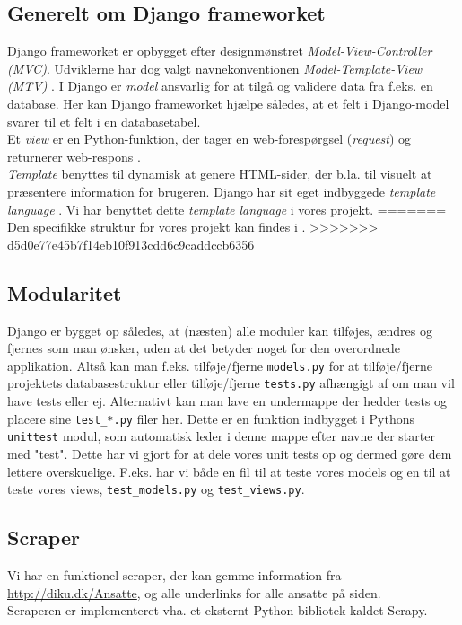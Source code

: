 \documentclass[12pt]{article}
\begin{document}
\subsection{Generelt om Django frameworket}
Django frameworket er opbygget efter designmønstret \textit{Model-View-Controller (MVC)}. Udviklerne har dog valgt navnekonventionen \textit{Model-Template-View (MTV)} \cite{djangoFAQ}. I Django er \textit{model} ansvarlig for at tilgå og validere data fra f.eks. en database. Her kan Django frameworket hjælpe således, at et felt i Django-model svarer til et felt i en databasetabel. \\
Et \textit{view} er en Python-funktion, der tager en web-forespørgsel (\textit{request}) og returnerer web-respons \cite{djangoView}. \\
\textit{Template} benyttes til dynamisk at genere HTML-sider, der b.la. til visuelt at præsentere information for brugeren. Django har sit eget indbyggede \textit{template language} \cite{djangoTemplate}. Vi har benyttet dette \textit{template language} i vores projekt.
=======
Den specifikke struktur for vores projekt kan findes i .
>>>>>>> d5d0e77e45b7f14eb10f913cdd6c9caddccb6356

\subsection{Modularitet}
Django er bygget op således, at (næsten) alle moduler kan tilføjes, ændres og fjernes som man ønsker, uden at det betyder noget for den overordnede applikation. Altså kan man f.eks. tilføje/fjerne \texttt{models.py} for at tilføje/fjerne projektets databasestruktur eller tilføje/fjerne \texttt{tests.py} afhængigt af om man vil have tests eller ej. Alternativt kan man lave en undermappe der hedder tests og placere sine \texttt{test\_*.py} filer her. Dette er en funktion indbygget i Pythons \texttt{unittest} modul, som automatisk leder i denne mappe efter navne der starter med "test".
Dette har vi gjort for at dele vores unit tests op og dermed gøre dem lettere overskuelige. F.eks. har vi både en fil til at teste vores models og en til at teste vores views, \texttt{test\_models.py} og \texttt{test\_views.py}.

\subsection{Scraper}
Vi har en funktionel scraper, der kan gemme information fra \url{http://diku.dk/Ansatte}, og alle underlinks for alle ansatte på siden.\\
Scraperen er implementeret vha. et eksternt Python bibliotek kaldet Scrapy.
\end{document}
